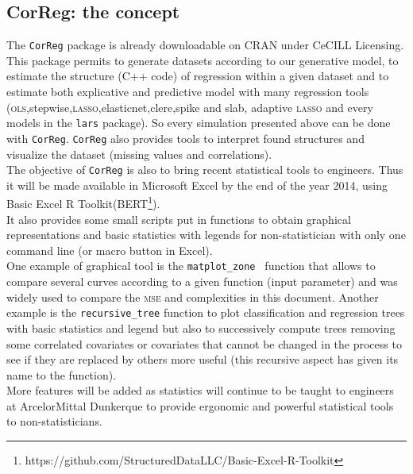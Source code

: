 \documentclass[12pt,a4paper]{report}
\begin{document}
\begin{appendices}
	\newpage
\chapter{CorReg: the concept}	
	
		The {\tt CorReg} package is already downloadable on CRAN under CeCILL Licensing. This package permits to generate datasets according to our generative model, to estimate the structure (C++ code) of regression within a given dataset and to estimate both explicative and predictive model with many regression tools (\textsc{ols},stepwise,\textsc{lasso},elasticnet,clere,spike and slab, adaptive \textsc{lasso} and every models in the {\tt lars} package). So every simulation presented above can be done with {\tt CorReg}.
	{\tt CorReg} also provides tools to interpret found structures and visualize the dataset (missing values and correlations). \\%
	The objective of {\tt CorReg} is also to bring recent statistical tools to engineers. Thus it will be made available in Microsoft Excel by the end of the year 2014, using Basic Excel R Toolkit(BERT\footnote{https://github.com/StructuredDataLLC/Basic-Excel-R-Toolkit}). \\
	
	It also provides some small scripts put in functions to obtain graphical representations and basic statistics with legends for non-statistician with only one command line (or macro button in Excel).\\
	 One example of graphical tool is the {\tt matplot\_zone } function that allows to compare several curves according to a given function (input parameter) and was widely used to compare the \textsc{mse} and complexities in this document. Another example is the {\tt recursive\_tree} function to plot classification and regression trees with basic statistics and legend but also to successively compute trees removing some correlated covariates or covariates that cannot be changed in the process to see if they are replaced by others more useful (this recursive aspect has given its name to the function).\\
	 
	More features will be added as statistics will continue to be taught to engineers at ArcelorMittal Dunkerque to provide ergonomic and powerful statistical tools to non-statisticians. \\
		

\end{appendices}
\end{document}

